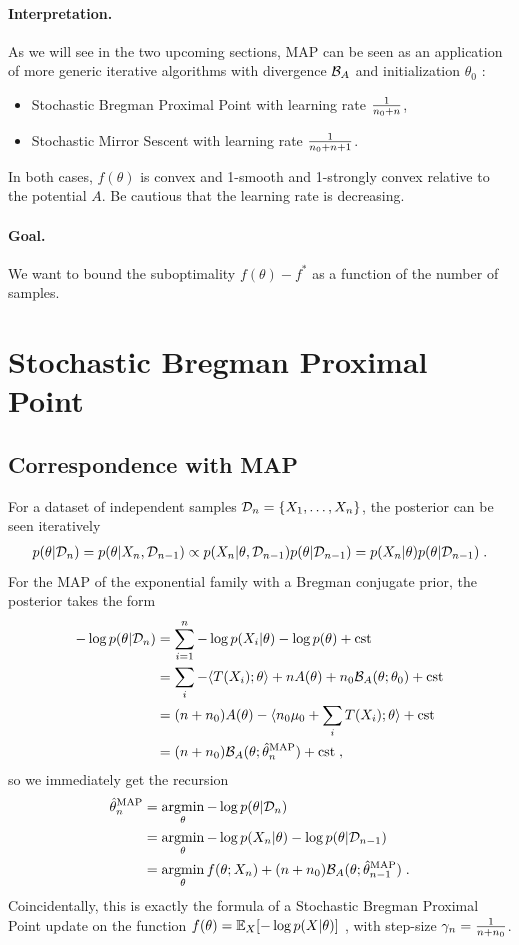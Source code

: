 \documentclass{article}
\newcommand{\logpart}{A}
\newcommand{\bregman}{\cB_\logpart}
\newcommand{\natp}{\theta}
\newcommand{\lr}{\gamma} %
\begin{document}
\paragraph{Interpretation.}
As we will see in the two upcoming sections, MAP can be seen as an application of more generic iterative algorithms with divergence $\bregman$ and initialization $\natp_0$ : 
\begin{itemize}
	\item Stochastic Bregman Proximal Point with learning rate $\frac{1}{n_0+n}$,
	\item Stochastic Mirror Sescent with learning rate  $\frac{1}{n_0+n +1}$.
\end{itemize}
In both cases, $f(\natp)$ is convex and 1-smooth  and 1-strongly convex relative to the potential $\logpart$. Be cautious that the learning rate is decreasing.

\paragraph{Goal.} We want to bound the suboptimality $f(\natp) - f^*$ as a function of the number of samples. 


\section{Stochastic Bregman Proximal Point}
\subsection{Correspondence with MAP}
For a dataset of independent samples ${\mathcal D}_n = \{X_1,\dots,X_n\}$, the posterior can be seen iteratively
\begin{align}
	p(\natp |\cD_n)
	=p(\natp|X_n,\cD_{n-1})
	\propto p(X_n|\natp,\cD_{n-1}) p(\natp|\cD_{n-1})
	=p(X_n|\natp)p(\natp |\cD_{n-1}) \; .
\end{align}
For the MAP of the exponential family with a Bregman conjugate prior, the posterior takes the form
\begin{align}
	- \log p(\natp | \cD_n) 
	&= \sum_{i=1}^n -\log p(X_i | \natp) - \log p(\natp) + \cst\\
	&= \sum_i - \langle T(X_i) ; \natp \rangle  + n \logpart(\natp) + n_0 \bregman(\natp ; \natp_0) +\cst \\
	&= (n+n_0)\logpart(\natp)  - \langle n_0 \mu_0 + \sum_i T(X_i) ; \natp \rangle + \cst \\
	&= (n+n_0) \bregman(\natp; \hat \natp_n^\text{MAP}) + \cst \; ,
\end{align}
so we immediately get the recursion
\begin{align}
    \hat \natp_n^\text{MAP}
    &= \argmin_\natp - \log p(\natp | \cD_n) \\
    &= \argmin_\natp - \log p(X_n|\natp) - \log p(\natp | \cD_{n-1}) \\
    &= \argmin_\natp f(\natp; X_{n}) + (n+n_0) \bregman(\natp; \hat \natp_{n-1}^\text{MAP})  \; .
\end{align} 
Coincidentally, this is exactly the formula of a Stochastic Bregman Proximal Point update on the function $f(\natp) = \E_X[-\log p(X|\natp)]$ , with step-size $\lr_n = \inv{n+n_0}$.
\end{document}
